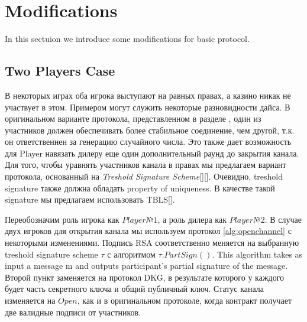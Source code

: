 \section{Modifications}
In this sectuion we introduce some modifications for basic protocol. 
	\subsection{Two Players Case}
В некоторых играх оба игрока выступают на равных правах, а казино никак не участвует в этом. Примером могут служить некоторые разновидности дайса. В оригинальном варианте протокола, представленном  в разделе , один из участников должен обеспечивать более стабильное соединение, чем другой, т.к. он ответственнен за генерацию случайного числа. Это также дает возможность для Player навязать дилеру еще один дополнительный раунд до закрытия канала. Для того, чтобы уравнять участников канала в правах мы предлагаем вариант протокола, основанный на \textit {Treshold Signature Scheme}[][]. Очевидно, treshold signature также должна обладать property of uniqueness. В качестве такой signature мы предлагаем использовать TBLS[].

Переобозначим роль игрока как $Player№1$, а роль дилера как $Player№2$.
В случае двух игроков для открытия канала мы используем протокол \autoref{alg:openchannel} с некоторыми изменениями. Подпись RSA соответственно меняется на выбранную treshold signature scheme $ \tau $ с алгоритмом $\tau .PartSign()$. This algorithm takes as input a message m and outputs participant's partial signature of the message. Второй пункт заменяется на протокол DKG, в результате которого у каждого будет часть секретного ключа и общий публичный ключ. Статус канала изменяется на $Open$, как и в оригинальном протоколе, когда контракт получает две валидные подписи от участников. 


